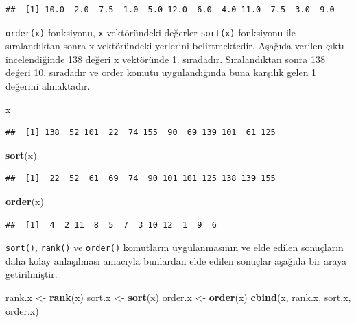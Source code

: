\documentclass[
]{book}
\newenvironment{Shaded}{\begin{snugshade}}{\end{snugshade}}
\newcommand{\FunctionTok}[1]{\textcolor[rgb]{0.13,0.29,0.53}{\textbf{#1}}}
\newcommand{\NormalTok}[1]{#1}
\newcommand{\OtherTok}[1]{\textcolor[rgb]{0.56,0.35,0.01}{#1}}
\begin{document}
\begin{verbatim}
##  [1] 10.0  2.0  7.5  1.0  5.0 12.0  6.0  4.0 11.0  7.5  3.0  9.0
\end{verbatim}

\texttt{order(x)} fonksiyonu, \texttt{x} vektöründeki değerler \texttt{sort(x)} fonksiyonu ile sıralandıktan sonra x vektöründeki yerlerini belirtmektedir. Aşağıda verilen çıktı incelendiğinde 138 değeri x vektöründe 1. sıradadır. Sıralandıktan sonra 138 değeri 10. sıradadır ve order komutu uygulandığında buna karşılık gelen 1 değerini almaktadır.

\begin{Shaded}
\begin{Highlighting}[]
\NormalTok{x}
\end{Highlighting}
\end{Shaded}

\begin{verbatim}
##  [1] 138  52 101  22  74 155  90  69 139 101  61 125
\end{verbatim}

\begin{Shaded}
\begin{Highlighting}[]
\FunctionTok{sort}\NormalTok{(x)}
\end{Highlighting}
\end{Shaded}

\begin{verbatim}
##  [1]  22  52  61  69  74  90 101 101 125 138 139 155
\end{verbatim}

\begin{Shaded}
\begin{Highlighting}[]
\FunctionTok{order}\NormalTok{(x)}
\end{Highlighting}
\end{Shaded}

\begin{verbatim}
##  [1]  4  2 11  8  5  7  3 10 12  1  9  6
\end{verbatim}

\texttt{sort()}, \texttt{rank()} ve \texttt{order()} komutların uygulanmasının ve elde edilen sonuçların daha kolay anlaşılması amacıyla bunlardan elde edilen sonuçlar aşağıda bir araya getirilmiştir.

\begin{Shaded}
\begin{Highlighting}[]
\NormalTok{rank.x }\OtherTok{\textless{}{-}} \FunctionTok{rank}\NormalTok{(x)}
\NormalTok{sort.x }\OtherTok{\textless{}{-}} \FunctionTok{sort}\NormalTok{(x)}
\NormalTok{order.x }\OtherTok{\textless{}{-}} \FunctionTok{order}\NormalTok{(x)}
\FunctionTok{cbind}\NormalTok{(x, rank.x, sort.x, order.x)}
\end{Highlighting}
\end{Shaded}
\end{document}
